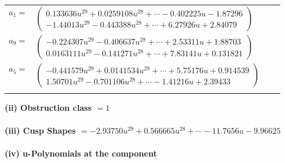 \documentclass[1p]{elsarticle_modified}
\theoremstyle{definition}
\begin{document}
\begin{tabular}{m{7pt} m{180pt} m{7pt} m{180pt} }
\flushright $a_{1}=$&$\begin{pmatrix}0.133636 u^{29}+0.0259108 u^{28}+\cdots-0.402225 u-1.87296\\-1.44013 u^{29}-0.443388 u^{28}+\cdots+6.27926 u+2.84079\end{pmatrix}$ \\
\flushright $a_{9}=$&$\begin{pmatrix}-0.224307 u^{29}-0.406637 u^{28}+\cdots+2.53311 u+1.88703\\0.0163111 u^{29}-0.141271 u^{28}+\cdots+7.83141 u+0.131821\end{pmatrix}$ \\
\flushright $a_{5}=$&$\begin{pmatrix}-0.441579 u^{29}+0.0141534 u^{28}+\cdots+5.75176 u+0.914539\\1.50701 u^{29}-0.701106 u^{28}+\cdots-1.41216 u+2.39433\end{pmatrix}$\\&\end{tabular}
\flushleft \textbf{(ii) Obstruction class $= 1$}\\~\\
\flushleft \textbf{(iii) Cusp Shapes $= -2.93750 u^{29}+0.566665 u^{28}+\cdots-11.7656 u-9.96625$}\\~\\
\newpage\renewcommand{\arraystretch}{1}
\flushleft \textbf{(iv) u-Polynomials at the component}\newline \\
\end{document}
